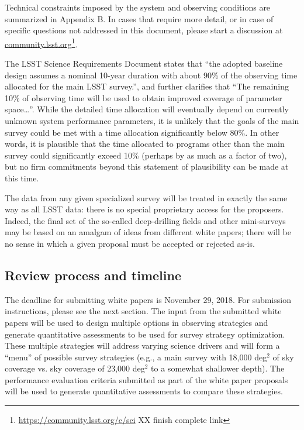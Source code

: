 \documentclass[DM,lsstdraft,toc,usenatbib]{lsstdoc}
\begin{document}
Technical constraints imposed by the system and observing conditions are summarized in 
Appendix B. In cases that require more detail, or in case of specific questions not addressed in this 
document, please start a discussion at \href{http://community.lsst.org}{community.lsst.org}\footnote{\url{https://community.lsst.org/c/sci} XX finish complete link}.

The LSST Science Requirements Document states that ``the adopted baseline design assumes a 
nominal 10-year duration with about 90\% of the observing time allocated for the main LSST survey.'',
and further clarifies that ``The remaining 10\% of observing time will be used to obtain improved 
coverage of parameter space\dots''. While the detailed time allocation will eventually depend on currently unknown system
performance parameters, it is unlikely that the goals of the main survey could be met with a time allocation
significantly below 80\%. In other words, it is plausible that the time allocated to programs other
than the main survey could significantly exceed 10\% (perhaps by as much as a factor of two), but 
no firm commitments beyond this statement of plausibility can be made at this time. 

The data from any given specialized survey will be treated in exactly the same way as all LSST 
data: there is no special proprietary access for the proposers. Indeed, the final set of the so-called
deep-drilling fields and other mini-surveys may be based on an amalgam of ideas from different 
white papers; there will be no sense in which a given proposal must be accepted or rejected as-is.  


\subsection{Review process and timeline}

The deadline for submitting white papers is November 29, 2018. For submission instructions, 
please see the next section. The input from the submitted white papers will be used to design multiple
options in observing strategies and generate quantitative assessments to be used for survey strategy optimization.
These multiple strategies will address varying science drivers and will form a ``menu'' of possible survey strategies (e.g., a main 
survey with 18,000 deg$^2$ of sky coverage vs. sky coverage of 23,000 deg$^2$ to a
somewhat shallower depth). The performance evaluation criteria submitted as part of the white paper proposals
will be used to generate quantitative assessments to compare these strategies. 
\end{document}

